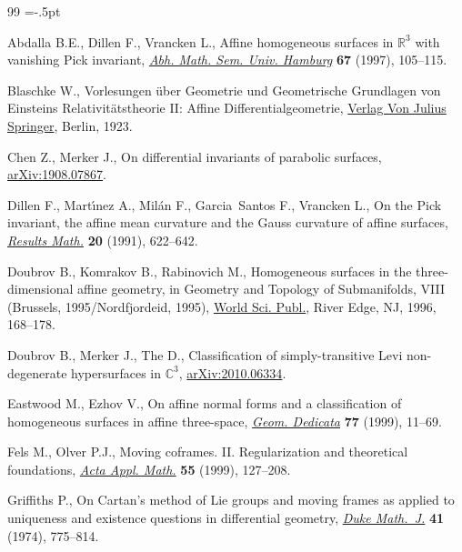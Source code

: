 \begin{thebibliography}{99}
\footnotesize\itemsep=-.5pt

Abdalla B.E., Dillen F., Vrancken L., Affine homogeneous surfaces in {${\mathbb
 R}^3$} with vanishing {P}ick invariant, \href{https://doi.org/10.1007/BF02940821}{\textit{Abh. Math. Sem. Univ.
 Hamburg}} \textbf{67} (1997), 105--115.

Blaschke W., Vorlesungen \"uber {G}eometrie und {G}eometrische {G}rundlagen von
 {E}insteins {R}elativit\"atstheorie {II}: {A}ffine {D}ifferentialgeometrie,
 \href{https://doi.org/10.1007/978-3-642-47392-0}{Verlag Von Julius Springer}, Berlin, 1923.

Chen Z., Merker J., On differential invariants of parabolic surfaces,
 \href{https://arxiv.org/abs/1908.07867}{arXiv:1908.07867}.

Dillen F., Mart\'{\i}nez A., Mil\'an F., Garcia~Santos F., Vrancken L., On the
 {P}ick invariant, the affine mean curvature and the {G}auss curvature of
 affine surfaces, \href{https://doi.org/10.1007/BF03323199}{\textit{Results Math.}} \textbf{20} (1991), 622--642.

Doubrov B., Komrakov B., Rabinovich M., Homogeneous surfaces in the
 three-dimensional affine geometry, in Geometry and Topology of Submanifolds,
 {VIII} ({B}russels, 1995/{N}ordfjordeid, 1995), \href{https://doi.org/10.1142/9789814530873}{World Sci. Publ.}, River Edge,
 NJ, 1996, 168--178.

Doubrov B., Merker J., The D., Classification of simply-transitive Levi
 non-degenerate hypersurfaces in $\mathbb{C}^3$, \href{https://arxiv.org/abs/2010.06334}{arXiv:2010.06334}.

Eastwood M., Ezhov V., On affine normal forms and a classification of
 homogeneous surfaces in affine three-space, \href{https://doi.org/10.1023/A:1005083518793}{\textit{Geom. Dedicata}}
 \textbf{77} (1999), 11--69.

Fels M., Olver P.J., Moving coframes. {II}. {R}egularization and theoretical
 foundations, \href{https://doi.org/10.1023/A:1006195823000}{\textit{Acta Appl. Math.}} \textbf{55} (1999), 127--208.

Griffiths P., On {C}artan's method of {L}ie groups and moving frames as applied
 to uniqueness and existence questions in differential geometry, \href{https://doi.org/10.1215/S0012-7094-74-04180-5}{\textit{Duke
 Math.~J.}} \textbf{41} (1974), 775--814.


\end{thebibliography}
